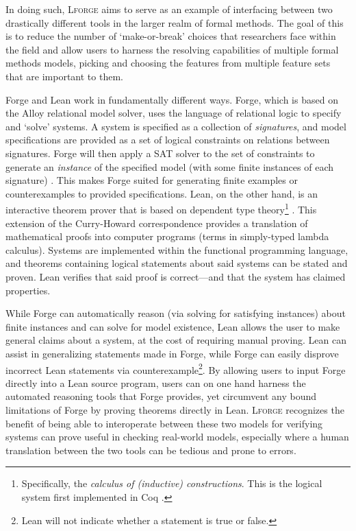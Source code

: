 In doing such, \textsc{Lforge} aims to serve as an example of interfacing between two drastically different tools in the larger realm of formal methods. The goal of this is to reduce the number of `make-or-break' choices that researchers face within the field and allow users to harness the resolving capabilities of multiple formal methods models, picking and choosing the features from multiple feature sets that are important to them. 

Forge and Lean work in fundamentally different ways. Forge, which is based on the Alloy relational model solver, uses the language of relational logic to specify and `solve' systems. A system is specified as a collection of \emph{signatures}, and model specifications are provided as a set of logical constraints on relations between signatures. Forge will then apply a SAT solver to the set of constraints to generate an \emph{instance} of the specified model (with some finite instances of each signature) \cite{jackson2019alloy,ngpdbccdlrrvwwk-oopsla-2024}. This makes Forge suited for generating finite examples or counterexamples to provided specifications. Lean, on the other hand, is an interactive theorem prover that is based on dependent type theory\footnote{Specifically, the \emph{calculus of (inductive) constructions}. This is the logical system first implemented in Coq \cite{bertot2008short}.} \cite{avigad2024theorem}. This extension of the Curry-Howard correspondence provides a translation of mathematical proofs into computer programs (terms in simply-typed lambda calculus). Systems are implemented within the functional programming language, and theorems containing logical statements about said systems can be stated and proven. Lean verifies that said proof is correct---and that the system has claimed properties.

While Forge can automatically reason (via solving for satisfying instances) about finite instances and can solve for model existence, Lean allows the user to make general claims about a system, at the cost of requiring manual proving. Lean can assist in generalizing statements made in Forge, while Forge can easily disprove incorrect Lean statements via counterexample\footnote{Lean will not indicate whether a statement is true or false.}. By allowing users to input Forge directly into a Lean source program, users can on one hand harness the automated reasoning tools that Forge provides, yet circumvent any bound limitations of Forge by proving theorems directly in Lean. \textsc{Lforge} recognizes the benefit of being able to interoperate between these two models for verifying systems can prove useful in checking real-world models, especially where a human translation between the two tools can be tedious and prone to errors. 

